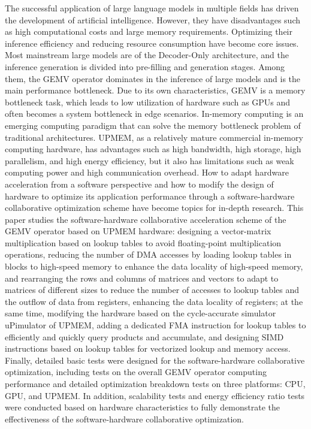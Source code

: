 \begin{abstracten}
The successful application of large language models in multiple fields has driven the development of artificial intelligence. However, they have disadvantages such as high computational costs and large memory requirements. Optimizing their inference efficiency and reducing resource consumption have become core issues. Most mainstream large models are of the Decoder-Only architecture, and the inference generation is divided into pre-filling and generation stages. Among them, the GEMV operator dominates in the inference of large models and is the main performance bottleneck. Due to its own characteristics, GEMV is a memory bottleneck task, which leads to low utilization of hardware such as GPUs and often becomes a system bottleneck in edge scenarios. In-memory computing is an emerging computing paradigm that can solve the memory bottleneck problem of traditional architectures. UPMEM, as a relatively mature commercial in-memory computing hardware, has advantages such as high bandwidth, high storage, high parallelism, and high energy efficiency, but it also has limitations such as weak computing power and high communication overhead. How to adapt hardware acceleration from a software perspective and how to modify the design of hardware to optimize its application performance through a software-hardware collaborative optimization scheme have become topics for in-depth research. This paper studies the software-hardware collaborative acceleration scheme of the GEMV operator based on UPMEM hardware: designing a vector-matrix multiplication based on lookup tables to avoid floating-point multiplication operations, reducing the number of DMA accesses by loading lookup tables in blocks to high-speed memory to enhance the data locality of high-speed memory, and rearranging the rows and columns of matrices and vectors to adapt to matrices of different sizes to reduce the number of accesses to lookup tables and the outflow of data from registers, enhancing the data locality of registers; at the same time, modifying the hardware based on the cycle-accurate simulator uPimulator of UPMEM, adding a dedicated FMA instruction for lookup tables to efficiently and quickly query products and accumulate, and designing SIMD instructions based on lookup tables for vectorized lookup and memory access. Finally, detailed basic tests were designed for the software-hardware collaborative optimization, including tests on the overall GEMV operator computing performance and detailed optimization breakdown tests on three platforms: CPU, GPU, and UPMEM. In addition, scalability tests and energy efficiency ratio tests were conducted based on hardware characteristics to fully demonstrate the effectiveness of the software-hardware collaborative optimization.
\end{abstracten}
